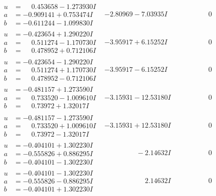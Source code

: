 \documentclass[1p]{elsarticle_modified}
\theoremstyle{definition}
\begin{document}
$$\begin{array}{c|c|c}
\begin{aligned}
u &= \phantom{-}0.453658 - 1.273930 I \\
a &= -0.909141 + 0.753474 I \\
b &= -0.611244 - 1.099830 I\end{aligned}
 & -2.80969 - 7.03935 I & \phantom{-0.000000 } 0 \\ \hline\begin{aligned}
u &= -0.423654 + 1.290220 I \\
a &= \phantom{-}0.511274 - 1.170730 I \\
b &= \phantom{-}0.478952 + 0.712106 I\end{aligned}
 & -3.95917 + 6.15252 I & \phantom{-0.000000 } 0 \\ \hline\begin{aligned}
u &= -0.423654 - 1.290220 I \\
a &= \phantom{-}0.511274 + 1.170730 I \\
b &= \phantom{-}0.478952 - 0.712106 I\end{aligned}
 & -3.95917 - 6.15252 I & \phantom{-0.000000 } 0 \\ \hline\begin{aligned}
u &= -0.481157 + 1.273590 I \\
a &= \phantom{-}0.733520 - 1.009610 I \\
b &= \phantom{-}0.73972 + 1.32017 I\end{aligned}
 & -3.15931 - 12.53180 I & \phantom{-0.000000 } 0 \\ \hline\begin{aligned}
u &= -0.481157 - 1.273590 I \\
a &= \phantom{-}0.733520 + 1.009610 I \\
b &= \phantom{-}0.73972 - 1.32017 I\end{aligned}
 & -3.15931 + 12.53180 I & \phantom{-0.000000 } 0 \\ \hline\begin{aligned}
u &= -0.404101 + 1.302230 I \\
a &= -0.555826 + 0.886295 I \\
b &= -0.404101 - 1.302230 I\end{aligned}
 & \phantom{-0.000000 } -2.14632 I & \phantom{-0.000000 } 0 \\ \hline\begin{aligned}
u &= -0.404101 - 1.302230 I \\
a &= -0.555826 - 0.886295 I \\
b &= -0.404101 + 1.302230 I\end{aligned}
 & \phantom{-0.000000 -}2.14632 I & \phantom{-0.000000 } 0\\

\end{array}$$
\end{document}
